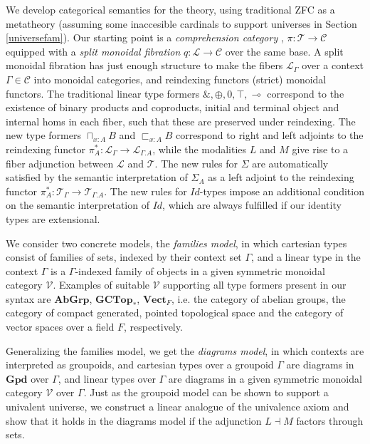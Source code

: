 \documentclass[a4paper,english]{lipics-v2018}
\begin{document}
We develop categorical semantics for the theory, using traditional ZFC as a metatheory (assuming some inaccesible cardinals to support universes in Section \ref{universefam}). Our starting point is a \textit{comprehension category} \cite{jacobs}, $\pi : \mathcal{T} \to \mathcal{C}$ equipped with a \textit{split monoidal fibration} $q : \mathcal{L} \to \mathcal{C}$ over the same base. A split monoidal fibration has just enough structure to make the fibers $\mathcal{L}_\Gamma$ over a context $\Gamma \in \mathcal{C}$ into monoidal categories, and reindexing functors (strict) monoidal functors. The traditional linear type formers $\&, \oplus, 0, \top, \multimap$ correspond to the existence of binary products and coproducts, initial and terminal object and internal homs in each fiber, such that these are preserved under reindexing. The new type formers $\sqcap_{x : A}B$ and $\sqsubset_{x :A}B$ correspond to right and left adjoints to the reindexing functor $\pi_A^* : \mathcal{L}_{\Gamma} \to \mathcal{L}_{\Gamma.A}$, while the modalities $L$ and $M$ give rise to a fiber adjunction between $\mathcal{L}$ and $\mathcal{T}$. The new rules for $\Sigma$ are automatically satisfied by the semantic interpretation of $\Sigma_A$ as a left adjoint to the reindexing functor $\pi_A^* : \mathcal{T}_\Gamma \to \mathcal{T}_{\Gamma.A}$. The new rules for $Id$-types impose an additional condition on the semantic interpretation of $Id$, which are always fulfilled if our identity types are extensional.

We consider two concrete models, the \textit{families model}, in which cartesian types consist of families of sets, indexed by their context set $\Gamma$, and a linear type in the context $\Gamma$ is a $\Gamma$-indexed family of objects in a given symmetric monoidal category $\mathcal{V}$. Examples of suitable $\mathcal{V}$ supporting all type formers present in our syntax are $\mathbf{AbGrp}$, $\mathbf{GCTop}_*$, $\mathbf{Vect}_F$, i.e. the category of abelian groups, the category of compact generated, pointed topological space and the category of vector spaces over a field $F$, respectively.

Generalizing the families model, we get the \textit{diagrams model}, in which contexts are interpreted as groupoids, and cartesian types over a groupoid $\Gamma$ are diagrams in $\mathbf{Gpd}$ over $\Gamma$, and linear types over $\Gamma$ are diagrams in a given symmetric monoidal category $\mathcal{V}$ over $\Gamma$. Just as the groupoid model \cite{hofmann1998} can be shown to support a univalent universe, we construct a linear analogue of the univalence axiom and show that it holds in the diagrams model if the adjunction $L \dashv M$ factors through sets.
\end{document}
